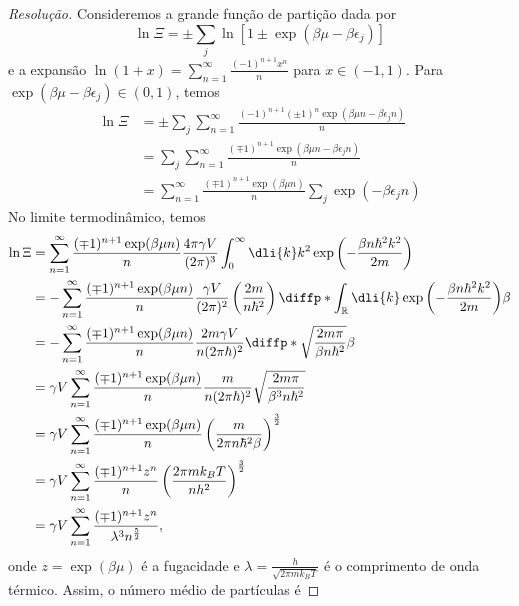 \begin{proof}[Resolução]
    Consideremos a grande função de partição dada por
    \begin{equation*}
        \ln \Xi = \pm \sum_j \ln\left[1 \pm \exp(\beta \mu - \beta \epsilon_j)\right]
    \end{equation*}
    e a expansão \(\ln(1 + x) = \sum_{n = 1}^\infty \frac{(-1)^{n+1} x^n}{n}\) para \(x \in (-1,1)\). Para \(\exp(\beta \mu - \beta \epsilon_j) \in (0, 1)\), temos
    \begin{align*}
        \ln \Xi &= \pm \sum_j \sum_{n=1}^\infty \frac{(-1)^{n+1} \left(\pm 1\right)^n\exp(\beta \mu n - \beta \epsilon_j n)}{n}\\
                &= \sum_j \sum_{n=1}^\infty \frac{(\mp 1)^{n+1} \exp(\beta \mu n - \beta \epsilon_j n)}{n}\\
                &= \sum_{n=1}^\infty \frac{(\mp 1)^{n+1}\exp(\beta \mu n)}{n} \sum_{j} \exp(-\beta \epsilon_j n)
    \end{align*}
    No limite termodinâmico, temos
    \begin{align*}
        \ln\Xi &= \sum_{n=1}^\infty \frac{(\mp 1)^{n+1}\exp(\beta \mu n)}{n} \frac{4\pi \gamma V}{(2\pi)^3}\int_0^\infty \dli{k} k^2\exp\left(-\frac{\beta n \hbar^2 k^2}{2m}\right)\\
               &= -\sum_{n=1}^\infty \frac{(\mp 1)^{n+1} \exp(\beta \mu n)}{n} \frac{\gamma V}{(2\pi)^2}\left(\frac{2m}{n \hbar^2}\right) \diffp*{\int_{\mathbb{R}}\dli{k} \exp\left(-\frac{\beta n \hbar^2 k^2}{2m}\right)}{\beta}\\
               &= - \sum_{n=1}^\infty \frac{(\mp1)^{n+1} \exp(\beta \mu n)}{n}\frac{2m\gamma V}{n(2\pi\hbar)^2} \diffp*{\sqrt{\frac{2m \pi}{\beta n \hbar^2}}}{\beta}\\
               &= \gamma V\sum_{n=1}^\infty \frac{(\mp1)^{n+1} \exp(\beta \mu n)}{n}\frac{m}{n(2\pi\hbar)^2} \sqrt{\frac{2m \pi}{\beta^3 n \hbar^2}}\\
               &=\gamma V \sum_{n=1}^\infty \frac{(\mp1)^{n+1} \exp(\beta \mu n)}{n} \left(\frac{m}{ 2\pi n \hbar^2 \beta}\right)^{\frac32}\\
               &= \gamma V \sum_{n=1}^\infty \frac{(\mp1)^{n+1} z^n}{n} \left(\frac{2\pi m k_B T}{n h^2}\right)^{\frac32}\\
               &= \gamma V \sum_{n=1}^\infty \frac{(\mp1)^{n+1} z^n}{\lambda^3 n^{\frac52}},
    \end{align*}
    onde \(z = \exp(\beta \mu)\) é a fugacidade e \(\lambda = \frac{h}{\sqrt{2\pi m k_B T}}\) é o comprimento de onda térmico. Assim, o número médio de partículas é

\end{proof}
